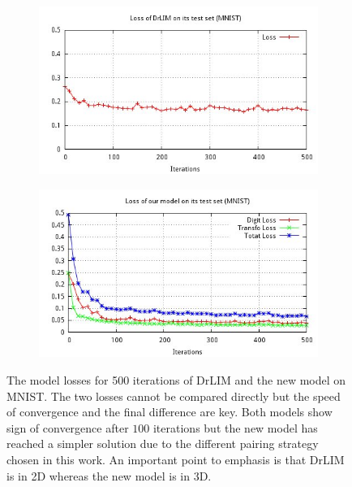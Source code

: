 \documentclass[a4paper,12pt]{report}
\begin{document}
\begin{figure}[h]
    \centering
    \begin{subfigure}{0.45\textwidth}
        \centering
        \includegraphics[width=\textwidth]{thesis_figures/final_loss_testset_2bv7.jpg}
    \end{subfigure}
    \begin{subfigure}{0.45\textwidth}
        \centering
        \includegraphics[width=\textwidth]{thesis_figures/final_loss_testset_3Dc3.jpg}
    \end{subfigure}
    \caption{The model losses for 500 iterations of DrLIM and the new model on MNIST.
    The two losses cannot be compared directly but the speed of convergence and the final difference are key.
    Both models show sign of convergence after $100$ iterations but the new model has reached a simpler solution due to the different pairing strategy chosen in this work.
    An important point to emphasis is that DrLIM is in 2D whereas the new model is in 3D.
    }
    \label{fig:mnist_cl2d_loss}
\end{figure}
\end{document}
